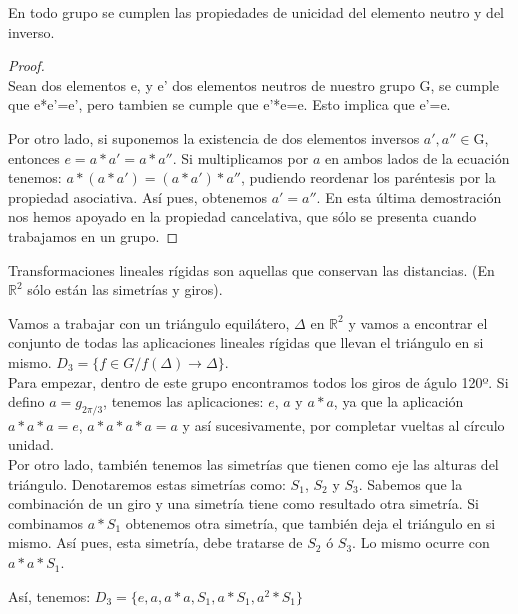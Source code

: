 \documentclass[a4paper,10pt]{apuntes}
\begin{document}
 En todo grupo se cumplen las propiedades de unicidad del elemento neutro y del inverso. 
 \begin{proof}
 \\Sean dos elementos e, y e' dos elementos neutros de nuestro grupo G, se cumple que e*e'=e', pero tambien se cumple que e'*e=e. Esto 
 implica que e'=e.

 Por otro lado, si suponemos la existencia de dos elementos inversos $a',a''\in$G, entonces $e=a*a'=a*a''$. Si multiplicamos por $a$ en ambos lados de la ecuación tenemos: $a*(a*a')=(a*a')*a''$, pudiendo reordenar los paréntesis por la 
 propiedad asociativa. Así pues, obtenemos $a'=a''$.
 En esta última demostración nos hemos apoyado en la propiedad cancelativa, que sólo se presenta cuando trabajamos en un grupo.
 \end{proof}
  
 \begin{defn}
  Transformaciones lineales rígidas son aquellas que conservan las distancias. (En $\mathds{R}^{2}$  sólo están las simetrías y giros).
 \end{defn}
 
 \begin{example} 
  Vamos a trabajar con un triángulo equilátero, $\Delta$  en $\mathds{R}^{2}$  y vamos a encontrar el conjunto de todas las aplicaciones lineales rígidas 
  que llevan el triángulo en si mismo. $D_{3}=\{f\in G / f(\Delta)\longrightarrow\Delta\}$.\\
  Para empezar, dentro de este grupo encontramos todos los giros de águlo 120º. Si defino $a=g_{2\pi/3}$, tenemos las aplicaciones:
  $e$, $a$  y $a*a$, ya que la aplicación $a*a*a=e$, $a*a*a*a=a$  y así sucesivamente, por completar vueltas al círculo unidad.\\
  Por otro lado, también tenemos las simetrías que tienen como eje las alturas del triángulo. Denotaremos estas simetrías como: $S_{1}$, $S_{2}$  y $S_{3}$.
  Sabemos que la combinación de un giro y una simetría tiene como resultado otra simetría. Si combinamos $a*S_{1}$  obtenemos otra simetría, 
  que también deja el triángulo en si mismo. Así pues, esta simetría, debe tratarse de $S_{2}$  ó $S_{3}$. Lo mismo ocurre con $a*a*S_{1}$.
  
  Así, tenemos: $D_{3}=\{e, a, a*a, S_{1}, a*S_{1}, a^{2}*S_{1}\}$
 \end{example}
\end{document}
